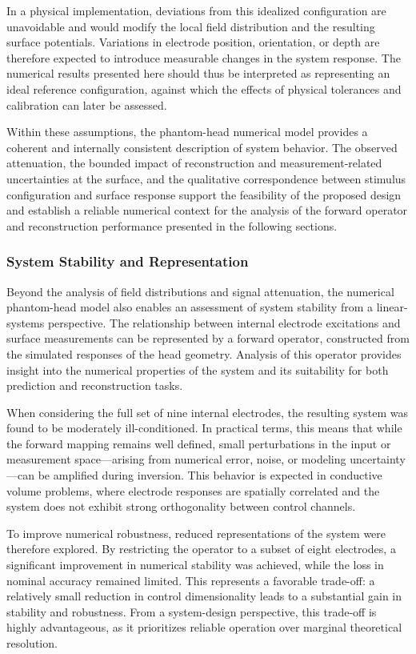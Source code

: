 \documentclass[../00_Main.tex]{subfiles}
\begin{document}
In a physical implementation, deviations from this idealized configuration are unavoidable and would modify the local field distribution and the resulting surface potentials. Variations in electrode position, orientation, or depth are therefore expected to introduce measurable changes in the system response. The numerical results presented here should thus be interpreted as representing an ideal reference configuration, against which the effects of physical tolerances and calibration can later be assessed.

Within these assumptions, the phantom-head numerical model provides a coherent and internally consistent description of system behavior. The observed attenuation, the bounded impact of reconstruction and measurement-related uncertainties at the surface, and the qualitative correspondence between stimulus configuration and surface response support the feasibility of the proposed design and establish a reliable numerical context for the analysis of the forward operator and reconstruction performance presented in the following sections.

\subsubsection{System Stability and Representation}
Beyond the analysis of field distributions and signal attenuation, the numerical phantom-head model also enables an assessment of system stability from a linear-systems perspective. The relationship between internal electrode excitations and surface measurements can be represented by a forward operator, constructed from the simulated responses of the head geometry. Analysis of this operator provides insight into the numerical properties of the system and its suitability for both prediction and reconstruction tasks.

When considering the full set of nine internal electrodes, the resulting system was found to be moderately ill-conditioned. In practical terms, this means that while the forward mapping remains well defined, small perturbations in the input or measurement space—arising from numerical error, noise, or modeling uncertainty—can be amplified during inversion. This behavior is expected in conductive volume problems, where electrode responses are spatially correlated and the system does not exhibit strong orthogonality between control channels.

To improve numerical robustness, reduced representations of the system were therefore explored. By restricting the operator to a subset of eight electrodes, a significant improvement in numerical stability was achieved, while the loss in nominal accuracy remained limited. This represents a favorable trade-off: a relatively small reduction in control dimensionality leads to a substantial gain in stability and robustness. From a system-design perspective, this trade-off is highly advantageous, as it prioritizes reliable operation over marginal theoretical resolution.
\end{document}
